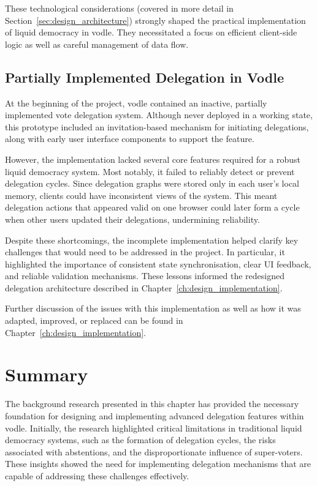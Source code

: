 These technological considerations (covered in more detail in Section~\ref{sec:design_architecture}) strongly shaped the practical implementation of liquid democracy in vodle. They necessitated a focus on efficient client-side logic as well as careful management of data flow.

\subsection{Partially Implemented Delegation in Vodle}\label{subsec:background_existing_delegation}
At the beginning of the project, vodle contained an inactive, partially implemented vote delegation system. Although never deployed in a working state, this prototype included an invitation-based mechanism for initiating delegations, along with early user interface components to support the feature.

However, the implementation lacked several core features required for a robust liquid democracy system. Most notably, it failed to reliably detect or prevent delegation cycles. Since delegation graphs were stored only in each user's local memory, clients could have inconsistent views of the system. This meant delegation actions that appeared valid on one browser could later form a cycle when other users updated their delegations, undermining reliability.

Despite these shortcomings, the incomplete implementation helped clarify key challenges that would need to be addressed in the project. In particular, it highlighted the importance of consistent state synchronisation, clear UI feedback, and reliable validation mechanisms. These lessons informed the redesigned delegation architecture described in Chapter~\ref{ch:design_implementation}.

Further discussion of the issues with this implementation as well as how it was adapted, improved, or replaced can be found in Chapter~\ref{ch:design_implementation}.

\section{Summary}
The background research presented in this chapter has provided the necessary foundation for designing and implementing advanced delegation features within vodle. Initially, the research highlighted critical limitations in traditional liquid democracy systems, such as the formation of delegation cycles, the risks associated with abstentions, and the disproportionate influence of super-voters. These insights showed the need for implementing delegation mechanisms that are capable of addressing these challenges effectively.

